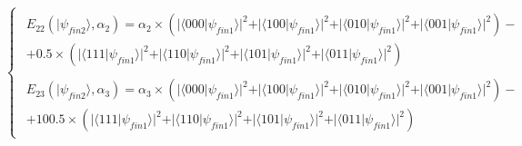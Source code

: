  \begin{equation}
\begin{cases}
\begin{split}
E_{22}(\vert\psi_{fin2}\rangle, \alpha_{2})=\alpha_{2}\times(\vert\langle000\vert\psi_{fin1}\rangle\vert^{2} + \vert\langle100\vert\psi_{fin1}\rangle\vert^{2}
+ \vert\langle010\vert\psi_{fin1}\rangle\vert^{2}
+ \vert\langle001\vert\psi_{fin1}\rangle\vert^{2}
 ) - \\
 + 0.5\times(\vert\langle111\vert\psi_{fin1}\rangle\vert^{2} + \vert\langle110\vert\psi_{fin1}\rangle\vert^{2}
+ \vert\langle101\vert\psi_{fin1}\rangle\vert^{2}
+ \vert\langle011\vert\psi_{fin1}\rangle\vert^{2}
 )
\end{split}
\\
\begin{split}
E_{23}(\vert\psi_{fin2}\rangle, \alpha_{3})=\alpha_{3}\times(\vert\langle000\vert\psi_{fin1}\rangle\vert^{2} + \vert\langle100\vert\psi_{fin1}\rangle\vert^{2}
+ \vert\langle010\vert\psi_{fin1}\rangle\vert^{2}
+ \vert\langle001\vert\psi_{fin1}\rangle\vert^{2}
 ) - \\
 + 100.5 \times(\vert\langle111\vert\psi_{fin1}\rangle\vert^{2} + \vert\langle110\vert\psi_{fin1}\rangle\vert^{2}
+ \vert\langle101\vert\psi_{fin1}\rangle\vert^{2}
+ \vert\langle011\vert\psi_{fin1}\rangle\vert^{2}
 )
\end{split}
\end{cases}
\label{eq:pirates_payoff3}
\end{equation}

